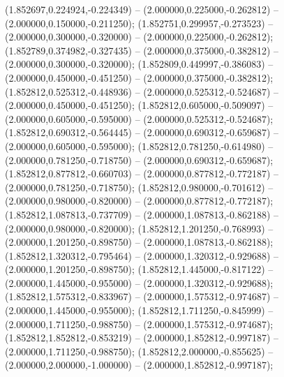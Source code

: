  (1.852697,0.224924,-0.224349) -- (2.000000,0.225000,-0.262812) -- (2.000000,0.150000,-0.211250);
 (1.852751,0.299957,-0.273523) -- (2.000000,0.300000,-0.320000) -- (2.000000,0.225000,-0.262812);
 (1.852789,0.374982,-0.327435) -- (2.000000,0.375000,-0.382812) -- (2.000000,0.300000,-0.320000);
 (1.852809,0.449997,-0.386083) -- (2.000000,0.450000,-0.451250) -- (2.000000,0.375000,-0.382812);
 (1.852812,0.525312,-0.448936) -- (2.000000,0.525312,-0.524687) -- (2.000000,0.450000,-0.451250);
 (1.852812,0.605000,-0.509097) -- (2.000000,0.605000,-0.595000) -- (2.000000,0.525312,-0.524687);
 (1.852812,0.690312,-0.564445) -- (2.000000,0.690312,-0.659687) -- (2.000000,0.605000,-0.595000);
 (1.852812,0.781250,-0.614980) -- (2.000000,0.781250,-0.718750) -- (2.000000,0.690312,-0.659687);
 (1.852812,0.877812,-0.660703) -- (2.000000,0.877812,-0.772187) -- (2.000000,0.781250,-0.718750);
 (1.852812,0.980000,-0.701612) -- (2.000000,0.980000,-0.820000) -- (2.000000,0.877812,-0.772187);
 (1.852812,1.087813,-0.737709) -- (2.000000,1.087813,-0.862188) -- (2.000000,0.980000,-0.820000);
 (1.852812,1.201250,-0.768993) -- (2.000000,1.201250,-0.898750) -- (2.000000,1.087813,-0.862188);
 (1.852812,1.320312,-0.795464) -- (2.000000,1.320312,-0.929688) -- (2.000000,1.201250,-0.898750);
 (1.852812,1.445000,-0.817122) -- (2.000000,1.445000,-0.955000) -- (2.000000,1.320312,-0.929688);
 (1.852812,1.575312,-0.833967) -- (2.000000,1.575312,-0.974687) -- (2.000000,1.445000,-0.955000);
 (1.852812,1.711250,-0.845999) -- (2.000000,1.711250,-0.988750) -- (2.000000,1.575312,-0.974687);
 (1.852812,1.852812,-0.853219) -- (2.000000,1.852812,-0.997187) -- (2.000000,1.711250,-0.988750);
 (1.852812,2.000000,-0.855625) -- (2.000000,2.000000,-1.000000) -- (2.000000,1.852812,-0.997187);
